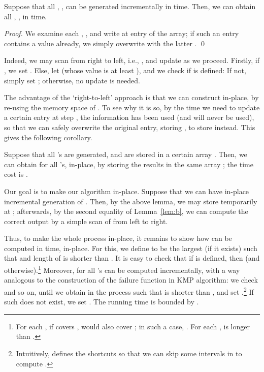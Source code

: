 \documentclass[11pt]{llncs}
\begin{document}
\begin{lemma}
Suppose that all , , can be 
generated incrementally in  time.  
Then, we can obtain all , , 
in  time.
\end{lemma}

\begin{proof}
  We examine each , , and write 
  at entry  of
  the  array; if such an entry contains a value  already,
  we simply overwrite  with the latter . \qed
\end{proof}

\noindent
Indeed, we may scan  from right to left, i.e., , and update  as we proceed. Firstly, if ,
we set . Else, let  (whose value
is at least ), and we check if  is defined: If not,
simply set ; otherwise, no update is needed.

\smallskip

\noindent
The advantage of the `right-to-left' approach is that we can construct
 in-place, by re-using the memory space of .  To see
why it is so, by the time we need to update a certain entry 
at step , the information  has been used (and will never be
used), so that we can safely overwrite the original entry, storing
, to store  instead.  This gives the following
corollary.

\begin{corollary}
\label{cor:t}
  Suppose that all 's are generated, and are stored in a certain array
  . Then, we can obtain  for all 's,
  in-place,
  by storing the results in the same array ; the time cost is
  .
\end{corollary}
 

\noindent
Our goal is to make our algorithm in-place. Suppose that we can have
in-place incremental generation of . Then, by the above lemma, we
may store  temporarily at ; afterwards, by the
second equality of Lemma~\ref{lem:b}, we can compute the correct
output  by a simple scan of  from left to right.

Thus, to make the whole process in-place, it remains to show how 
can be computed in  time, in-place.  For this, we define
 to be the largest  (if it exists) such that  and
length of  is shorter than .  It is easy to check that if
 is defined, then 
(and  otherwise).\footnote{For each , if  covers ,  would also cover
  ; in such a case, .  For each ,  is longer than .}  Moreover,
 for all 's can be computed incrementally, with a way
analogous to the construction of the failure function in KMP
algorithm: we check  and so on, until we obtain  in the
process such that  is shorter than , and set .\footnote{Intuitively,  defines the shortcuts so that we can
  skip some intervals in  to compute .} If such  does
not exist, we set . The running time
is bounded by .
\end{document}
